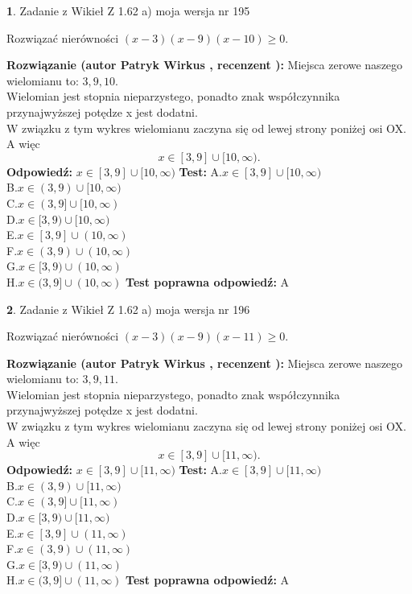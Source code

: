 \documentclass[12pt, a4paper]{article}
\theoremstyle{definition} %
\newtheorem{zad}{}
\newcommand{\zadStart}[1]{\begin{zad}#1\newline}
\newcommand{\zadStop}{\end{zad}}
\newcommand{\rozwStart}[2]{\noindent \textbf{Rozwiązanie (autor #1 , recenzent #2): }\newline}
\newcommand{\rozwStop}{\newline}
\newcommand{\odpStart}{\noindent \textbf{Odpowiedź:}\newline}
\newcommand{\odpStop}{\newline}
\newcommand{\testStart}{\noindent \textbf{Test:}\newline}
\newcommand{\testStop}{\newline}
\newcommand{\kluczStart}{\noindent \textbf{Test poprawna odpowiedź:}\newline}
\newcommand{\kluczStop}{\newline}
\begin{document}
\zadStart{Zadanie z Wikieł Z 1.62 a) moja wersja nr 195}

Rozwiązać nierówności $(x-3)(x-9)(x-10)\ge0$.
\zadStop
\rozwStart{Patryk Wirkus}{}
Miejsca zerowe naszego wielomianu to: $3, 9, 10$.\\
Wielomian jest stopnia nieparzystego, ponadto znak współczynnika przy\linebreak najwyższej potędze x jest dodatni.\\ W związku z tym wykres wielomianu zaczyna się od lewej strony poniżej osi OX. A więc $$x \in [3,9] \cup [10,\infty).$$
\rozwStop
\odpStart
$x \in [3,9] \cup [10,\infty)$
\odpStop
\testStart
A.$x \in [3,9] \cup [10,\infty)$\\
B.$x \in (3,9) \cup [10,\infty)$\\
C.$x \in (3,9] \cup [10,\infty)$\\
D.$x \in [3,9) \cup [10,\infty)$\\
E.$x \in [3,9] \cup (10,\infty)$\\
F.$x \in (3,9) \cup (10,\infty)$\\
G.$x \in [3,9) \cup (10,\infty)$\\
H.$x \in (3,9] \cup (10,\infty)$
\testStop
\kluczStart
A
\kluczStop



\zadStart{Zadanie z Wikieł Z 1.62 a) moja wersja nr 196}

Rozwiązać nierówności $(x-3)(x-9)(x-11)\ge0$.
\zadStop
\rozwStart{Patryk Wirkus}{}
Miejsca zerowe naszego wielomianu to: $3, 9, 11$.\\
Wielomian jest stopnia nieparzystego, ponadto znak współczynnika przy\linebreak najwyższej potędze x jest dodatni.\\ W związku z tym wykres wielomianu zaczyna się od lewej strony poniżej osi OX. A więc $$x \in [3,9] \cup [11,\infty).$$
\rozwStop
\odpStart
$x \in [3,9] \cup [11,\infty)$
\odpStop
\testStart
A.$x \in [3,9] \cup [11,\infty)$\\
B.$x \in (3,9) \cup [11,\infty)$\\
C.$x \in (3,9] \cup [11,\infty)$\\
D.$x \in [3,9) \cup [11,\infty)$\\
E.$x \in [3,9] \cup (11,\infty)$\\
F.$x \in (3,9) \cup (11,\infty)$\\
G.$x \in [3,9) \cup (11,\infty)$\\
H.$x \in (3,9] \cup (11,\infty)$
\testStop
\kluczStart
A
\kluczStop
\end{document}
